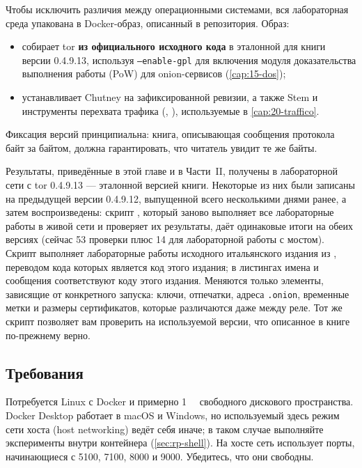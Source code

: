 Чтобы исключить различия между операционными системами, вся лабораторная среда упакована в Docker-образ, описанный в  репозитория. Образ:
\begin{itemize}
  \item собирает tor \textbf{из официального исходного кода} в эталонной для книги версии 0.4.9.13, используя \texttt{--enable-gpl} для включения модуля доказательства выполнения работы (PoW) для onion-сервисов (\cref{cap:15-dos});
  \item устанавливает Chutney на зафиксированной ревизии, а также Stem и инструменты перехвата трафика (, ), используемые в \cref{cap:20-traffico}.
\end{itemize}
Фиксация версий принципиальна: книга, описывающая сообщения протокола байт за байтом, должна гарантировать, что читатель увидит те же байты.

\begin{approfondimento}
Результаты, приведённые в этой главе и в Части~II, получены в лабораторной сети с tor 0.4.9.13 --- эталонной версией книги. Некоторые из них были записаны на предыдущей версии 0.4.9.12, выпущенной всего несколькими днями ранее, а затем воспроизведены: скрипт , который заново выполняет все лабораторные работы в живой сети и проверяет их результаты, даёт одинаковые итоги на обеих версиях (сейчас 53 проверки плюс 14 для лабораторной работы с мостом). Скрипт выполняет лабораторные работы исходного итальянского издания из , переводом кода которых является код этого издания; в листингах имена и сообщения соответствуют коду этого издания. Меняются только элементы, зависящие от конкретного запуска: ключи, отпечатки, адреса \texttt{.onion}, временные метки и размеры сертификатов, которые различаются даже между реле. Тот же скрипт позволяет вам проверить на используемой версии, что описанное в книге по-прежнему верно.
\end{approfondimento}

\subsection{Требования}

Потребуется Linux с Docker и примерно \SI{1}{\giga\byte} свободного дискового пространства. Docker Desktop работает в macOS и Windows, но используемый здесь режим сети хоста (host networking) ведёт себя иначе; в таком случае выполняйте эксперименты внутри контейнера (\cref{sec:rp-shell}). На хосте сеть использует порты, начинающиеся с 5100, 7100, 8000 и 9000. Убедитесь, что они свободны.

